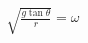 \documentclass[preview]{standalone}
\begin{document}
\begin{align*}
\sqrt{\frac{g\tan{\theta}}{r}}=\omega
\end{align*}
\end{document}

